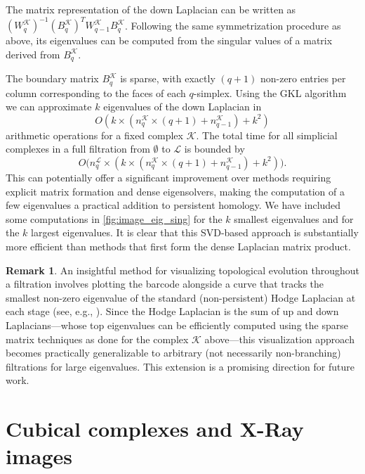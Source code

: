 \documentclass{article}
\theoremstyle{definition}
\newtheorem{remark}[theorem]{Remark}
\newcommand{\KK}{\mathcal{K}}
\newcommand{\LL}{\mathcal{L}}
\begin{document}
The matrix representation of the down Laplacian can be written as $(W_q^\KK)^{-1}\left(B^{\KK}_{q}\right)^T W_{q-1}^{\KK} B^{\KK}_{q}$. Following the same symmetrization procedure as above, its eigenvalues can be computed from the singular values of a  matrix derived from $B^{ \KK}_{q}$.

The boundary matrix $B^{\KK}_{q}$ is sparse, with exactly $(q+1)$ non-zero entries per column corresponding to the faces of each $q$-simplex.
Using the GKL algorithm we can approximate $k$ eigenvalues of the down Laplacian in 
\[
O\left(k\times (n_q^\KK\times (q+1)+n_{q-1}^\KK)+k^2\right)
\]
arithmetic operations for a fixed complex $\mathcal{K}$. The total time for all simplicial complexes in a full filtration from $\emptyset$ to $\mathcal{L}$ is bounded by
\[
O\Big(n_q^\LL\times\left(k\times (n_q^\KK\times (q+1)+n_{q-1}^\KK)+k^2\right)\Big).
\]
This can potentially offer a significant improvement over methods requiring explicit matrix formation and dense eigensolvers, making the computation of a few eigenvalues a practical addition to persistent homology. We have included some computations in \cref{fig:image_eig_sing} for the $k$ smallest eigenvalues and for the $k$ largest eigenvalues. It is clear that this SVD-based approach is substantially more efficient than methods that first form the dense Laplacian matrix product.

\begin{remark}
\label{rem:hodge-efficient}
An insightful method for visualizing topological evolution throughout a filtration involves plotting the barcode alongside a curve that tracks the smallest non-zero eigenvalue of the standard (non-persistent) Hodge Laplacian at each stage (see, e.g., \cite[Figure 5]{wei2023}). Since the Hodge Laplacian is the sum of up and down Laplacians---whose top eigenvalues can be efficiently computed using the sparse matrix techniques as done for the complex $\KK$ above---this visualization approach becomes practically generalizable to arbitrary (not necessarily non-branching) filtrations for large eigenvalues. This extension is a promising direction for future work.
\end{remark}



\section{Cubical complexes and X-Ray images}\label{subsec:cubical}
\end{document}
